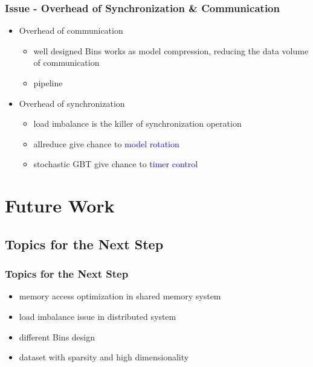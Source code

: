 \documentclass{beamer}
\begin{document}
\begin{frame}
	\frametitle{Issue - Overhead of Synchronization \& Communication}
	\begin{itemize}
		\item Overhead of communication
		\begin{itemize}			
			\item well designed Bins works as model compression, reducing the data volume of communication
			\item pipeline 
		\end{itemize}			
		\item Overhead of synchronization
		\begin{itemize}			
			\item load imbalance is the killer of synchronization operation
			\item allreduce give chance to \textcolor{blue}{model rotation}
			\item stochastic GBT give chance to \textcolor{blue}{timer control} 
		\end{itemize}			
		
	\end{itemize}
	
\end{frame}

\section{Future Work} %
\subsection{Topics for the Next Step} 
\begin{frame}
	\frametitle{Topics for the Next Step}
	\begin{itemize}
		\item memory access optimization in shared memory system
		\item load imbalance issue in distributed system
		\item different Bins design
		\item dataset with sparsity and high dimensionality
	\end{itemize}
\end{frame}




\end{document}
